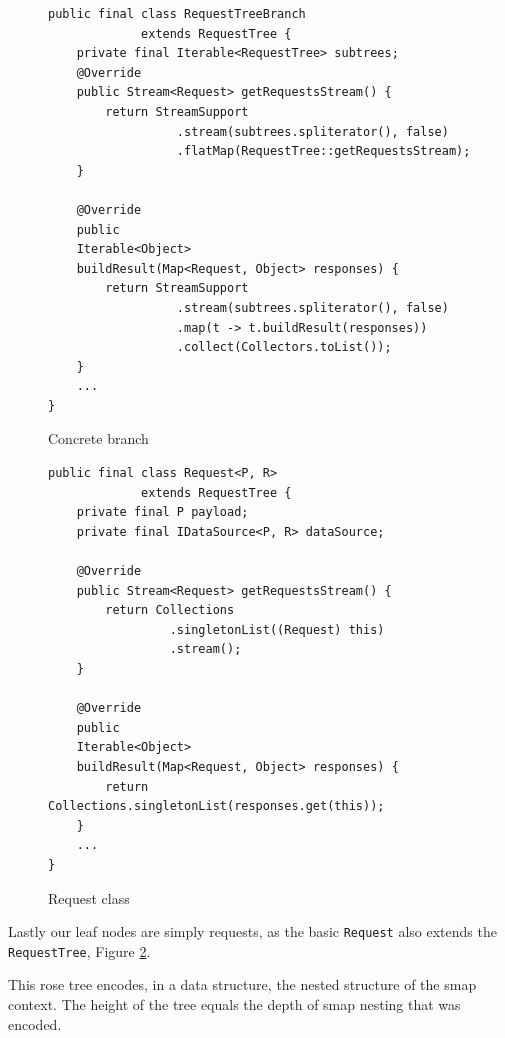 \begin{figure}

\begin{verbatim}
public final class RequestTreeBranch 
             extends RequestTree {
    private final Iterable<RequestTree> subtrees;
    @Override
    public Stream<Request> getRequestsStream() {
        return StreamSupport
                  .stream(subtrees.spliterator(), false)
                  .flatMap(RequestTree::getRequestsStream);
    }

    @Override
    public 
    Iterable<Object> 
    buildResult(Map<Request, Object> responses) {
        return StreamSupport
                  .stream(subtrees.spliterator(), false)
                  .map(t -> t.buildResult(responses))
                  .collect(Collectors.toList());
    }
    ...
}
\end{verbatim}
\caption{Concrete branch}
\label{figure:tree-impl-branch}

\end{figure}
\begin{figure}

\begin{verbatim}
public final class Request<P, R> 
             extends RequestTree {
    private final P payload;
    private final IDataSource<P, R> dataSource;

    @Override
    public Stream<Request> getRequestsStream() {
        return Collections
                 .singletonList((Request) this)
                 .stream();
    }

    @Override
    public 
    Iterable<Object> 
    buildResult(Map<Request, Object> responses) {
        return Collections.singletonList(responses.get(this));
    }
    ...
}
\end{verbatim}

\caption{Request class}
\label{figure:tree-impl-request-class}
\end{figure}

Lastly our leaf nodes are simply requests, as the basic \texttt{Request} also extends the \texttt{RequestTree}, Figure \ref{figure:tree-impl-request-class}.

This rose tree encodes, in a data structure, the nested structure of the smap context. 
The height of the tree equals the depth of smap nesting that was encoded.




